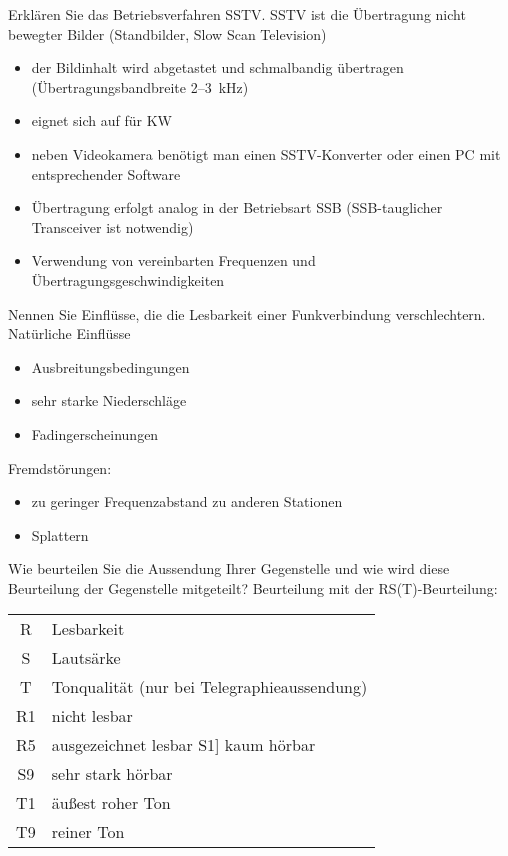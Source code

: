 \documentclass[avery5371,grid,frame,a4paper]{flashcards}
\newcommand{\card}[3]{
  \begin{flashcard}[{\chap} -- #1]{#2}#3\end{flashcard}
}
\begin{document}
\card{67}{Erklären Sie das Betriebsverfahren SSTV.}{
  \footnotesize
  SSTV ist die Übertragung nicht bewegter Bilder (Standbilder, Slow Scan Television)
  \begin{itemize}
    \item der Bildinhalt wird abgetastet und schmalbandig übertragen (Übertragungsbandbreite 2--3~kHz)
    \item eignet sich auf für KW
    \item neben Videokamera benötigt man einen SSTV-Konverter oder einen PC mit entsprechender Software
    \item Übertragung erfolgt analog in der Betriebsart SSB (SSB-tauglicher Transceiver ist notwendig)
    \item Verwendung von vereinbarten Frequenzen und Übertragungsgeschwindigkeiten
  \end{itemize}
}
\card{68}{Nennen Sie Einflüsse, die die Lesbarkeit einer Funkverbindung verschlechtern.}{
  \small
  Natürliche Einflüsse
  \begin{itemize}
    \item  Ausbreitungsbedingungen
    \item sehr starke Niederschläge
    \item Fadingerscheinungen
  \end{itemize}

  Fremdstörungen:
  \begin{itemize}
    \item zu geringer Frequenzabstand zu anderen Stationen
    \item Splattern
  \end{itemize}
}
\card{69}{Wie beurteilen Sie die Aussendung Ihrer Gegenstelle und wie wird diese Beurteilung der Gegenstelle mitgeteilt?}{
  Beurteilung mit der RS(T)-Beurteilung:

  \begin{tabular}{cl}
    R & Lesbarkeit \\
    S & Lautsärke \\
    T & Tonqualität (nur bei Telegraphieaussendung) \\

    R1 & nicht lesbar \\
    R5 & ausgezeichnet lesbar S1] kaum hörbar \\
    S9 & sehr stark hörbar \\
    T1 & äußest roher Ton \\
    T9 & reiner Ton \\
  \end{tabular}
}
\end{document}
